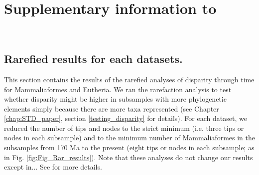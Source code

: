 \chapter{Supplementary information to }
\label{chap:Appendix_STD}

\bigskip
\medskip
\begin{center}

 \\
\bigskip
\end{center}

\section{Rarefied results for each datasets.}
This section contains the results of the rarefied analyses of disparity through time for Mammaliaformes and Eutheria.
We ran the rarefaction analysis to test whether disparity might be higher in subsamples with more phylogenetic elements simply because there are more taxa represented (see Chapter \ref{chap:STD_paper}, section \ref{testing_disparity} for details).
For each dataset, we reduced the number of tips and nodes to the strict minimum (i.e. three tips or nodes in each subsample) and to the minimum number of Mammaliaformes in the subsamples from 170 Ma to the present (eight tips or nodes in each subsample; as in Fig. \ref{fig:Fig_Rar_results}).
Note that these analyses do not change our results except in... See %
for more details.

